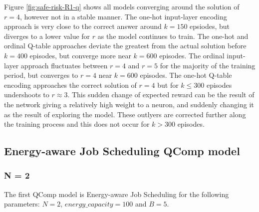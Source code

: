 Figure \ref{fig:safe-risk-R1-q} shows all models converging around the solution of $r = 4$, however not in a stable manner. The one-hot input-layer encoding approach is very close to the correct answer around $k = 150$ epsiodes, but diverges to a lower value for $r$ as the model continues to train. The one-hot and ordinal Q-table approaches deviate the greatest from the actual solution before $k = 400$ episodes, but converge more near $k = 600$ episodes. The ordinal input-layer approach fluctuates between $r = 4$ and $r = 5$ for the majority of the training period, but converges to $r = 4$ near $k = 600$ episodes. The one-hot Q-table encoding approaches the correct solution of $r = 4$ but for $k \leq 300$ episodes undershoots to $r \approx 3$. This sudden change of expected reward can be the result of the network giving a relatively high weight to a neuron, and suddenly changing it as the result of exploring the model. These outlyers are corrected further along the training process and this does not occur for $k > 300$ episodes.

\subsection{Energy-aware Job Scheduling QComp model}

\subsubsection*{N = 2}
The first QComp model is Energy-aware Job Scheduling for the following parameters: $N = 2$, $energy\_capacity = 100$ and $B = 5$.

